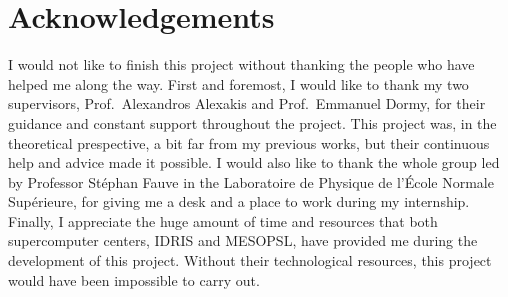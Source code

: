 \documentclass[../main.tex]{subfiles}
\begin{document}
\section*{Acknowledgements}
I would not like to finish this project without thanking the people who have helped me along the way. First and foremost, I would like to thank my two supervisors, Prof.\ Alexandros Alexakis and Prof.\ Emmanuel Dormy, for their guidance and constant support throughout the project. This project was, in the theoretical prespective, a bit far from my previous works, but their continuous help and advice made it possible. I would also like to thank the whole group led by Professor Stéphan Fauve in the Laboratoire de Physique de l'École Normale Supérieure, for giving me a desk and a place to work during my internship. Finally, I appreciate the huge amount of time and resources that both supercomputer centers, IDRIS and MESOPSL, have provided me during the development of this project. Without their technological resources, this project would have been impossible to carry out.
\end{document}
